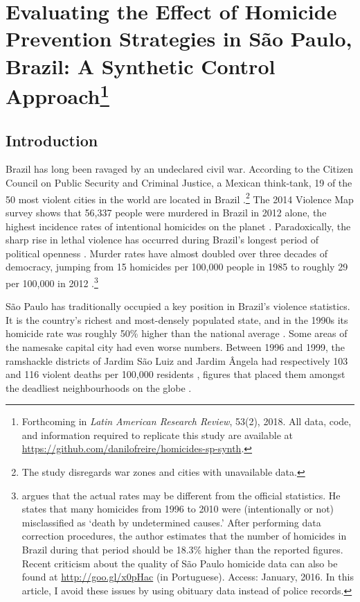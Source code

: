 \chapter{Evaluating the Effect of Homicide Prevention Strategies in São Paulo, Brazil: A Synthetic Control Approach\footnote{Forthcoming in \textit{Latin American Research Review}, 53(2), 2018. All data, code, and information required to replicate this study are available at \href{https://github.com/danilofreire/homicides-sp-synth}{https://github.com/danilofreire/homicides-sp-synth}.}}
\label{chap:synth}

\section{Introduction}

Brazil has long been ravaged by an undeclared civil war. According to the Citizen Council on Public Security and Criminal Justice, a Mexican think-tank, 19 of the 50 most violent cities in the world are located in Brazil \citep{mexico2014}.\footnote{The study disregards war zones and cities with unavailable data.} The 2014 Violence Map survey shows that 56,337 people were murdered in Brazil in 2012 alone, the highest incidence rates of intentional homicides on the planet \citep{mapa2014, unodc2013}. Paradoxically, the sharp rise in lethal violence has occurred during Brazil's longest period of political openness \citep{ahnen2003, pinheiro2000, pinheiro2001}. Murder rates have almost doubled over three decades of democracy, jumping from 15 homicides per 100,000 people in 1985 to roughly 29 per 100,000 in 2012 \citep{mapa2014}.\footnote{\citet{cerqueira2013} argues that the actual rates may be different from the official statistics. He states that many homicides from 1996 to 2010 were (intentionally or not) misclassified as `death by undetermined causes.' After performing data correction procedures, the author estimates that the number of homicides in Brazil during that period should be 18.3\% higher than the reported figures. Recent criticism about the quality of São Paulo homicide data can also be found at \url{http://goo.gl/x0pHac} (in Portuguese). Access: January, 2016. In this article, I avoid these issues by using obituary data instead of police records.}

São Paulo has traditionally occupied a key position in Brazil's violence statistics. It is the country's richest and most-densely populated state, and in the 1990s its homicide rate was roughly 50\% higher than the national average \citep[120]{barata2000}. Some areas of the namesake capital city had even worse numbers. Between 1996 and 1999, the ramshackle districts of Jardim São Luiz and Jardim Ângela had respectively 103 and 116 violent deaths per 100,000 residents \citep[8]{cardia2003}, figures that placed them amongst the deadliest neighbourhoods on the globe \citep{who2015}.

